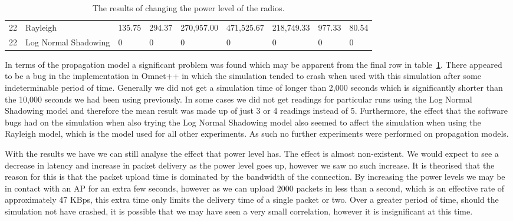 {\begin{landscape}
\begin{table}
\begin{tabularx}{\linewidth}{|X|X|X|X|X|X|X|X|X|}
                        22 & Rayleigh & 135.75 & 294.37 & 270,957.00 & 471,525.67 & 218,749.33 & 977.33 & 80.54 \\
                        22 & Log Normal Shadowing & 0 & 0 & 0 & 0 & 0 & 0 & 0 \\
                        \hline
                    \end{tabularx}
                    \caption{The results of changing the power level of the radios.}
                    \label{tab:power_level}
                \end{table}
            \end{landscape}
        }


        In terms of the propagation model a significant problem was found which may be apparent from the final row in table~\ref{tab:power_level}. There appeared to be a bug in the implementation in Omnet++ in which the simulation tended to crash when used with this simulation after some indeterminable period of time. Generally we did not get a simulation time of longer than 2,000 seconds which is significantly shorter than the 10,000 seconds we had been using previously. In some cases we did not get readings for particular runs using the Log Normal Shadowing model and therefore the mean result was made up of just 3 or 4 readings instead of 5. Furthermore, the effect that the software bugs had on the simulation when also trying the Log Normal Shadowing model also seemed to affect the simulation when using the Rayleigh model, which is the model used for all other experiments. As such no further experiments were performed on propagation models. 

        With the results we have we can still analyse the effect that power level has. The effect is almost non-existent. We would expect to see a decrease in latency and increase in packet delivery as the power level goes up, however we saw no such increase. It is theorised that the reason for this is that the packet upload time is dominated by the bandwidth of the connection. By increasing the power levels we may be in contact with an AP for an extra few seconds, however as we can upload 2000 packets in less than a second, which is an effective rate of approximately 47 KBps, this extra time only limits the delivery time of a single packet or two. Over a greater period of time, should the simulation not have crashed, it is possible that we may have seen a very small correlation, however it is insignificant at this time. 



